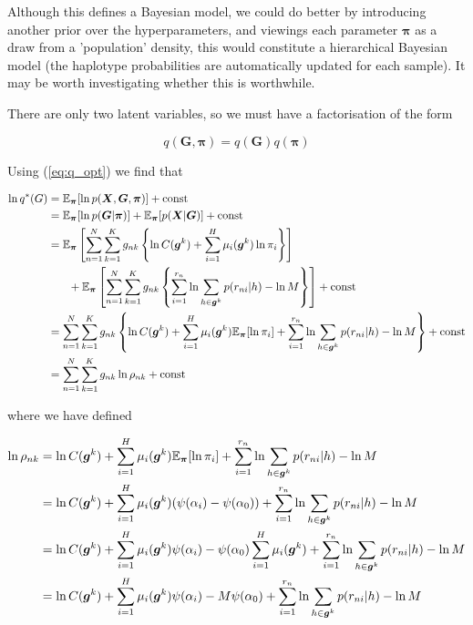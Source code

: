 \documentclass{article}
\begin{document}
Although this defines a Bayesian model, we could do better by introducing another prior over the hyperparameters, and viewings each parameter $\boldsymbol{\pi}$ as a draw from a 'population' density, this would constitute a hierarchical Bayesian model (the haplotype probabilities are automatically updated for each sample). It may be worth investigating whether this is worthwhile. 

There are only two latent variables, so we must have a factorisation of the form

\begin{equation}
q(\boldsymbol{G}, \boldsymbol{\pi}) = q(\boldsymbol{G})q(\boldsymbol{\pi})
\end{equation}

Using (\ref{eq:q_opt}) we find that

\begin{align}
    \ln q^*(G) &= \mathbb{E}_{\boldsymbol{\pi}}[\ln p(\boldsymbol{X}, \boldsymbol{G}, \boldsymbol{\pi})] + \text{const}\notag\\
    &= \mathbb{E}_{\boldsymbol{\pi}}[\ln p(\boldsymbol{G} | \boldsymbol{\pi})] + \mathbb{E}_{\boldsymbol{\pi}}[p(\boldsymbol{X} | \boldsymbol{G})] + \text{const} \notag\\
    &= \mathbb{E}_{\boldsymbol{\pi}}\left[ \sum_{n = 1}^N \sum_{k = 1}^K g_{nk} \left\{ \ln C(\boldsymbol{g}^k) + \sum_{i = 1}^H \mu_i(\boldsymbol{g}^k) \ln \pi_i \right\} \right] \notag\\ &\phantom{{}=1} + \mathbb{E}_{\boldsymbol{\pi}}\left[ \sum_{n = 1}^N \sum_{k = 1}^K g_{nk} \left\{ \sum_{i = 1}^{r_n} \ln \sum_{h \in \boldsymbol{g}^k} p(r_{ni} | h) - \ln M \right\} \right] + \text{const}\notag\\
    &= \sum_{n = 1}^N \sum_{k = 1}^K g_{nk} \left\{ \ln C(\boldsymbol{g}^k) + \sum_{i = 1}^H \mu_i(\boldsymbol{g}^k) \mathbb{E}_{\boldsymbol{\pi}}[\ln \pi_i] + \sum_{i = 1}^{r_n} \ln \sum_{h \in \boldsymbol{g}^k} p(r_{ni} | h) - \ln M \right\} + \text{const}\notag\\
    &= \sum_{n = 1}^N \sum_{k = 1}^K g_{nk} \ln \rho_{nk} + \text{const}
\end{align}

where we have defined

\begin{align}
    \ln \rho_{nk} &= \ln C(\boldsymbol{g}^k) + \sum_{i = 1}^H \mu_i(\boldsymbol{g}^k) \mathbb{E}_{\boldsymbol{\pi}}[\ln \pi_i] + \sum_{i = 1}^{r_n} \ln \sum_{h \in \boldsymbol{g}^k} p(r_{ni} | h) - \ln M\notag\\
    &= \ln C(\boldsymbol{g}^k) + \sum_{i = 1}^H \mu_i(\boldsymbol{g}^k) (\psi(\alpha_i) - \psi(\alpha_0)) + \sum_{i = 1}^{r_n} \ln \sum_{h \in \boldsymbol{g}^k} p(r_{ni} | h) - \ln M\notag\\
    &= \ln C(\boldsymbol{g}^k) + \sum_{i = 1}^H \mu_i(\boldsymbol{g}^k) \psi(\alpha_i) - \psi(\alpha_0)\sum_{i = 1}^H \mu_i(\boldsymbol{g}^k) + \sum_{i = 1}^{r_n} \ln \sum_{h \in \boldsymbol{g}^k} p(r_{ni} | h) - \ln M\notag\\
    &= \ln C(\boldsymbol{g}^k) + \sum_{i = 1}^H \mu_i(\boldsymbol{g}^k) \psi(\alpha_i) - M\psi(\alpha_0) + \sum_{i = 1}^{r_n} \ln \sum_{h \in \boldsymbol{g}^k} p(r_{ni} | h) - \ln M
\end{align}
\end{document}
